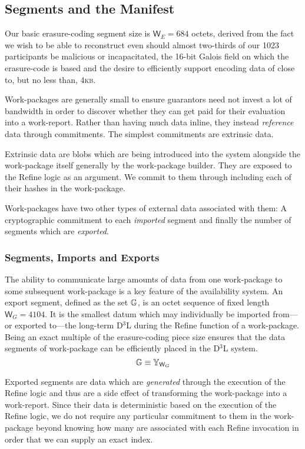 \subsection{Segments and the Manifest}

Our basic erasure-coding segment size is $\mathsf{W}_E = 684$ octets, derived from the fact we wish to be able to reconstruct even should almost two-thirds of our 1023 participants be malicious or incapacitated, the 16-bit Galois field on which the erasure-code is based and the desire to efficiently support encoding data of close to, but no less than, 4\textsc{kb}.

Work-packages are generally small to ensure guarantors need not invest a lot of bandwidth in order to discover whether they can get paid for their evaluation into a work-report. Rather than having much data inline, they instead \emph{reference} data through commitments. The simplest commitments are extrinsic data.

Extrinsic data are blobs which are being introduced into the system alongside the work-package itself generally by the work-package builder. They are exposed to the Refine logic as an argument. We commit to them through including each of their hashes in the work-package.

Work-packages have two other types of external data associated with them: A cryptographic commitment to each \emph{imported} segment and finally the number of segments which are \emph{exported}.

\subsubsection{Segments, Imports and Exports}

The ability to communicate large amounts of data from one work-package to some subsequent work-package is a key feature of the \Jam availability system. An export segment, defined as the set $\mathbb{G}$, is an octet sequence of fixed length $\mathsf{W}_G = 4104$. It is the smallest datum which may individually be imported from---or exported to---the long-term D$^3$L during the Refine function of a work-package. Being an exact multiple of the erasure-coding piece size ensures that the data segments of work-package can be efficiently placed in the D$^3$L system.
\begin{equation}\label{eq:segment}
  \mathbb{G} \equiv \mathbb{Y}_{\mathsf{W}_G}
\end{equation}

Exported segments are data which are \emph{generated} through the execution of the Refine logic and thus are a side effect of transforming the work-package into a work-report. Since their data is deterministic based on the execution of the Refine logic, we do not require any particular commitment to them in the work-package beyond knowing how many are associated with each Refine invocation in order that we can supply an exact index.

